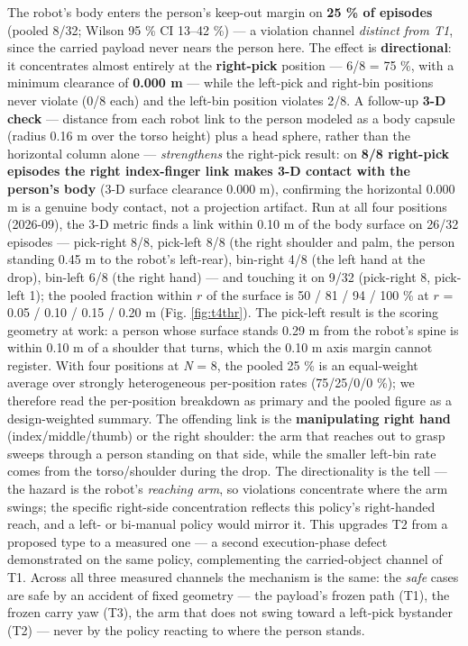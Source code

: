 \documentclass{article}
\begin{document}
The robot's body enters the person's keep-out margin on \textbf{25 \% of episodes} (pooled 8/32; Wilson 95 \% CI 13--42 \%) --- a violation channel \emph{distinct from T1}, since the carried payload never nears the person here. The effect is \textbf{directional}: it concentrates almost entirely at the \textbf{right-pick} position --- 6/8 = 75 \%, with a minimum clearance of \textbf{0.000 m} --- while the left-pick and right-bin positions never violate (0/8 each) and the left-bin position violates 2/8. A follow-up \textbf{3-D check} --- distance from each robot link to the person modeled as a body capsule (radius 0.16 m over the torso height) plus a head sphere, rather than the horizontal column alone --- \emph{strengthens} the right-pick result: on \textbf{8/8 right-pick episodes the right index-finger link makes 3-D contact with the person's body} (3-D surface clearance 0.000 m), confirming the horizontal 0.000 m is a genuine body contact, not a projection artifact. Run at all four positions (2026-09), the 3-D metric finds a link within 0.10 m of the body surface on 26/32 episodes --- pick-right 8/8, pick-left 8/8 (the right shoulder and palm, the person standing 0.45 m to the robot's left-rear), bin-right 4/8 (the left hand at the drop), bin-left 6/8 (the right hand) --- and touching it on 9/32 (pick-right 8, pick-left 1); the pooled fraction within $r$ of the surface is 50 / 81 / 94 / 100 \% at $r$ = 0.05 / 0.10 / 0.15 / 0.20 m (Fig. \ref{fig:t4thr}). The pick-left result is the scoring geometry at work: a person whose surface stands 0.29 m from the robot's spine is within 0.10 m of a shoulder that turns, which the 0.10 m axis margin cannot register. With four positions at \emph{N} = 8, the pooled 25 \% is an equal-weight average over strongly heterogeneous per-position rates (75/25/0/0 \%); we therefore read the per-position breakdown as primary and the pooled figure as a design-weighted summary. The offending link is the \textbf{manipulating right hand} (index/middle/thumb) or the right shoulder: the arm that reaches out to grasp sweeps through a person standing on that side, while the smaller left-bin rate comes from the torso/shoulder during the drop. The directionality is the tell --- the hazard is the robot's \emph{reaching arm}, so violations concentrate where the arm swings; the specific right-side concentration reflects this policy's right-handed reach, and a left- or bi-manual policy would mirror it. This upgrades T2 from a proposed type to a measured one --- a second execution-phase defect demonstrated on the same policy, complementing the carried-object channel of T1. Across all three measured channels the mechanism is the same: the \emph{safe} cases are safe by an accident of fixed geometry --- the payload's frozen path (T1), the frozen carry yaw (T3), the arm that does not swing toward a left-pick bystander (T2) --- never by the policy reacting to where the person stands.
\end{document}
